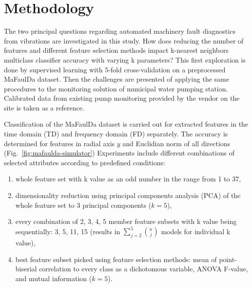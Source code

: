 \documentclass{llncs}
\begin{document}
\section{Methodology}
The two principal questions regarding automated machinery fault diagnostics from vibrations are investigated in this study. How does reducing the number of features and different feature selection methods impact k-nearest neighbors multiclass classifier accuracy with varying k parameters? This first exploration is done by supervised learning with 5-fold cross-validation on a preprocessed MaFaulDa dataset. Then the challenges are presented of applying the same procedures to the monitoring solution of municipal water pumping station. Calibrated data from existing pump monitoring provided by the vendor on the site is taken as a reference.

Classification of the MaFaulDa dataset is carried out for extracted features in the time domain (TD) and frequency domain (FD) separately. The accuracy is determined for features in radial axis $y$ and Euclidian norm of all directions (Fig.~\ref{fig:mafaulda-simulator})  Experiments include different combinations of selected attributes according to predefined conditions:
\begin{enumerate}
\item whole feature set with k value as an odd number in the range from 1 to 37,
\item dimensionality reduction using principal components analysis (PCA) of the whole feature set to 3 principal components ($k = 5$),
\item every combination of 2, 3, 4, 5 member feature subsets with k value being sequentially: 3, 5, 11, 15 (results in $\sum_{j = 2}^{5}{n\choose j}$ models for individual k value),
\item best feature subset picked using feature selection methods: mean of point-biserial correlation to every class as a dichotomous variable, ANOVA F-value, and mutual information ($k = 5$).
\end{enumerate}
\end{document}
